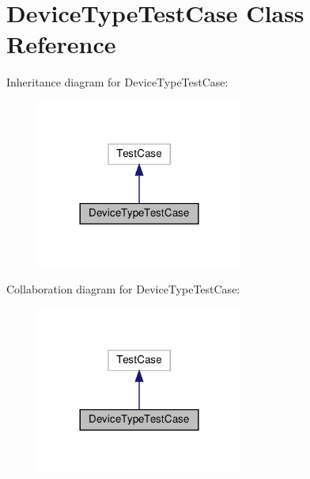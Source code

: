 \hypertarget{classstm__tools_1_1tests_1_1devicetype__test_1_1DeviceTypeTestCase}{}\section{Device\+Type\+Test\+Case Class Reference}
\label{classstm__tools_1_1tests_1_1devicetype__test_1_1DeviceTypeTestCase}


Inheritance diagram for Device\+Type\+Test\+Case\+:
\nopagebreak
\begin{figure}[H]
\begin{center}
\leavevmode
\includegraphics[width=192pt]{classstm__tools_1_1tests_1_1devicetype__test_1_1DeviceTypeTestCase__inherit__graph}
\end{center}
\end{figure}


Collaboration diagram for Device\+Type\+Test\+Case\+:
\nopagebreak
\begin{figure}[H]
\begin{center}
\leavevmode
\includegraphics[width=192pt]{classstm__tools_1_1tests_1_1devicetype__test_1_1DeviceTypeTestCase__coll__graph}
\end{center}
\end{figure}
